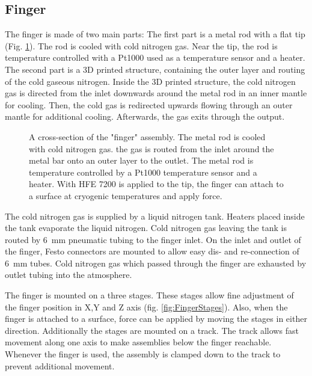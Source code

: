\subsection{Finger}

The finger is made of two main parts: The first part is a metal rod with a flat tip (Fig. \ref{fig:querschnittfinger}). The rod is cooled with cold nitrogen gas. Near the tip, the rod is temperature controlled with a Pt1000 used as a temperature sensor and a heater. The second part is a 3D printed structure, containing the outer layer and routing of the cold gaseous nitrogen. Inside the 3D printed structure, the cold nitrogen gas is directed from the inlet downwards around the metal rod in an inner mantle for cooling. Then, the cold gas is redirected upwards flowing through an outer mantle for additional cooling. Afterwards, the gas exits through the output.

\begin{figure}[hbt!]
	\centering
	
	\caption{A cross-section of the "finger" assembly. The metal rod is cooled with cold nitrogen gas. the gas is routed from the inlet around the metal bar onto an outer layer to the outlet. The metal rod is temperature controlled by a Pt1000 temperature sensor and a heater. With HFE 7200 is applied to the tip, the finger can attach to a surface at cryogenic temperatures and apply force. }
	\label{fig:querschnittfinger}
\end{figure}

The cold nitrogen gas is supplied by a liquid nitrogen tank. Heaters placed inside the tank evaporate the liquid nitrogen. Cold nitrogen gas leaving the tank is routed by \SI{6}{\milli\meter} pneumatic tubing to the finger inlet. On the inlet and outlet of the finger, Festo connectors are mounted to allow easy dis- and re-connection of \SI{6}{\milli\meter} tubes. Cold nitrogen gas which passed through the finger are exhausted by outlet tubing into the atmosphere.

The finger is mounted on a three stages. These stages allow fine adjustment of the finger position in X,Y and Z axis (fig. \ref{fig:FingerStages}). Also, when the finger is attached to a surface, force can be applied by moving the stages in either direction. Additionally the stages are mounted on a track. The track allows fast movement along one axis to make assemblies below the finger reachable. Whenever the finger is used, the assembly is clamped down to the track to prevent additional movement.

